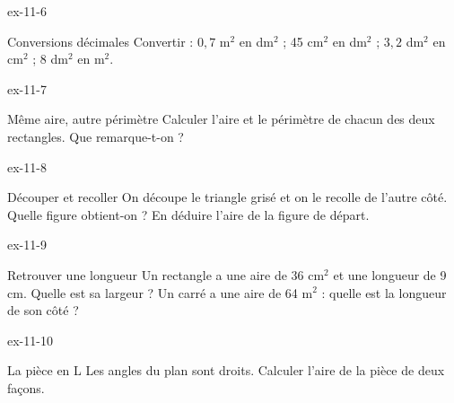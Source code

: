 \begin{blocLivre}{ex-11-6}\begin{exercice}[2]{Conversions décimales}
Convertir : $0{,}7$ m$^2$ en dm$^2$ ; 45 cm$^2$ en dm$^2$ ; $3{,}2$ dm$^2$ en cm$^2$ ; 8 dm$^2$ en m$^2$.
\end{exercice}\end{blocLivre}
\begin{blocLivre}{ex-11-7}\begin{exercice}[2]{Même aire, autre périmètre}
Calculer l’aire et le périmètre de chacun des deux rectangles. Que remarque-t-on ?
\label{fig-ex-11-7}
\end{exercice}\end{blocLivre}
\begin{blocLivre}{ex-11-8}\begin{exercice}[2]{Découper et recoller}
On découpe le triangle grisé et on le recolle de l’autre côté. Quelle figure obtient-on ? En déduire l’aire de la figure de départ.
\label{fig-ex-11-8}
\end{exercice}\end{blocLivre}
\begin{blocLivre}{ex-11-9}\begin{exercice}[2]{Retrouver une longueur}
Un rectangle a une aire de 36 cm$^2$ et une longueur de 9 cm. Quelle est sa largeur ? Un carré a une aire de 64 m$^2$ : quelle est la longueur de son côté ?
\end{exercice}\end{blocLivre}
\begin{blocLivre}{ex-11-10}\begin{exercice}[2]{La pièce en L}
Les angles du plan sont droits. Calculer l’aire de la pièce de deux façons.
\label{fig-ex-11-10}
\end{exercice}\end{blocLivre}

